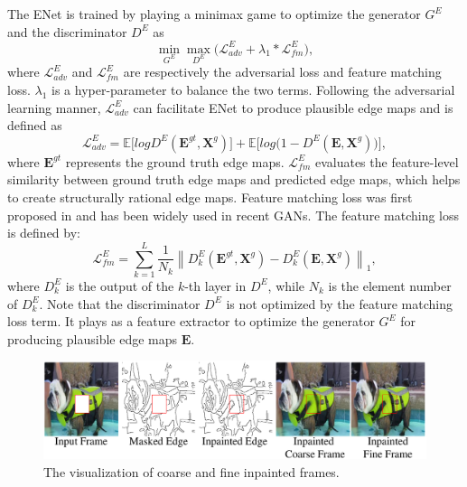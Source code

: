The ENet is trained by playing a minimax game to optimize the generator $G^E$ and the discriminator $D^E$ as
\begin{equation}
\label{eq:loss_e}
\min\limits_{G^E} \max \limits_{D^E} \big(\mathcal{L}^E_{adv}+\lambda_1 * \mathcal{L}^E_{fm}\big),
\end{equation}
where $\mathcal{L}^E_{adv}$ and $\mathcal{L}^E_{fm}$ are respectively the adversarial loss and feature matching loss. 
$\lambda_1$ is a hyper-parameter to balance the two terms.
%
Following the adversarial learning manner, $\mathcal{L}^E_{adv}$ can facilitate ENet to produce plausible edge maps and is defined as
\begin{equation} \label{eq:edge_adver}
\mathcal{L}^E_{adv}  =\mathbb{E}\big[logD^E(\boldsymbol{E}^{gt},\boldsymbol{X}^{g})\big] +\mathbb{E} \big[log\big(1-D^E ( \boldsymbol{E},\boldsymbol{X}^{g})\big)\big],
\end{equation}
where $\boldsymbol{E}^{gt}$ represents the ground truth edge maps. $\mathcal{L}^E_{fm}$ evaluates the feature-level similarity between ground truth edge maps and predicted edge maps, which helps to create structurally rational edge maps. 
Feature matching loss was first proposed in \cite{wang2018high} and has been widely used in recent GANs.
The feature matching loss is defined by:
\begin{equation}
\label{eq:edge_fm}
\mathcal{L}^E_{fm}=\sum_{k=1}^L{\frac{1}{N_k}\left\| D^E_k(\boldsymbol{E}^{gt},\boldsymbol{X}^{g})- D^E_k(\boldsymbol{E},\boldsymbol{X}^{g})\right\|_1},
\end{equation}
where $D^E_k$ is the output of the $k$-th layer in $D^E$, while $N_k$ is the element number of $D^E_k$. 
Note that the discriminator $D^E$ is not optimized by the feature matching loss term. It plays as a feature extractor to optimize the generator $G^E$ for producing plausible edge maps $\boldsymbol{E}$.


\begin{figure}[t]
	\centering
	\includegraphics[width=1.0\columnwidth]{coars-fine} %
	\caption{The visualization of coarse and fine inpainted frames.}
	
	\label{fig:coarse-fine}
\end{figure}



